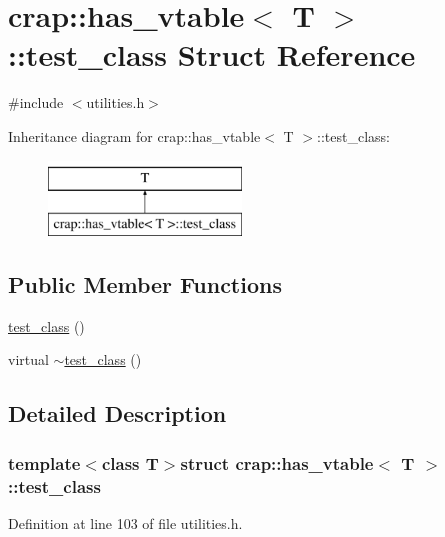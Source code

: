 \hypertarget{structcrap_1_1has__vtable_1_1test__class}{\section{crap\+:\+:has\+\_\+vtable$<$ T $>$\+:\+:test\+\_\+class Struct Reference}
\label{structcrap_1_1has__vtable_1_1test__class}
}


{\ttfamily \#include $<$utilities.\+h$>$}

Inheritance diagram for crap\+:\+:has\+\_\+vtable$<$ T $>$\+:\+:test\+\_\+class\+:\begin{figure}[H]
\begin{center}
\leavevmode
\includegraphics[height=2.000000cm]{structcrap_1_1has__vtable_1_1test__class}
\end{center}
\end{figure}
\subsection*{Public Member Functions}
\begin{DoxyCompactItemize}
\item 
\hyperlink{structcrap_1_1has__vtable_1_1test__class_a6e4ee5125a96ae1e7d9ca1c64c4cd8fe}{test\+\_\+class} ()
\item 
virtual \hyperlink{structcrap_1_1has__vtable_1_1test__class_ac1ec56b0a5223d91214a50cba6acd28f}{$\sim$test\+\_\+class} ()
\end{DoxyCompactItemize}


\subsection{Detailed Description}
\subsubsection*{template$<$class T$>$struct crap\+::has\+\_\+vtable$<$ T $>$\+::test\+\_\+class}



Definition at line 103 of file utilities.\+h.



